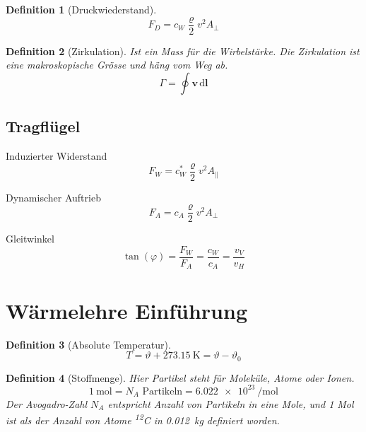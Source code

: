 \documentclass[a4paper, twocolumn]{article}
\numberwithin{equation}{section}
\theoremstyle{hsr-def}
\newtheorem{definition}{Definition}[section]
\theoremstyle{hsr-sub}
\newcommand{\dd}[1]{\ensuremath{\mathrm{d}#1}}
\newcommand{\di}[1]{\,\dd{#1}}
\renewcommand{\vec}[1]{\ensuremath{\mathbf{#1}}}
\begin{document}
\begin{definition}[Druckwiederstand]
\[
    F_D = c_W \frac{\varrho}{2}v^2 A_\perp
\]
\end{definition}

\begin{definition}[Zirkulation] Ist ein Mass f\"ur die Wirbelst\"arke.
Die Zirkulation ist eine makroskopische Gr\"osse und h\"ang vom Weg ab.
\[
    \Gamma = \oint \vec{v} \di{\vec{l}}
\]
\end{definition}

\subsection{Tragfl\"ugel}

Induzierter Widerstand
\[
    F_W = c_W^* \frac{\varrho}{2} v^2 A_\parallel
\]

Dynamischer Auftrieb
\[
    F_A = c_A \frac{\varrho}{2} v^2 A_\perp
\]

Gleitwinkel
\[
    \tan(\varphi) = \frac{F_W}{F_A} = \frac{c_W}{c_A} = \frac{v_V}{v_H}
\]

\section{W\"armelehre Einf\"uhrung}
\begin{definition}[Absolute Temperatur]
\[
    T = \vartheta + \SI{273.15}{\kelvin} = \vartheta - \vartheta_0
\]
\end{definition}

\begin{definition}[Stoffmenge]
Hier \emph{Partikel} steht f\"ur Molek\"ule, Atome oder Ionen.
\[
    \SI{1}{\mole} = N_A \text{ Partikeln} = \SI{6.022e23}{\per\mole}
\]
Der Avogadro-Zahl \(N_A\) entspricht Anzahl von Partikeln in eine Mole, und 1 Mol ist als der Anzahl von Atome \textsuperscript{12}C in \SI{0.012}{\kilo\gram} definiert worden.
\end{definition}
\end{document}
